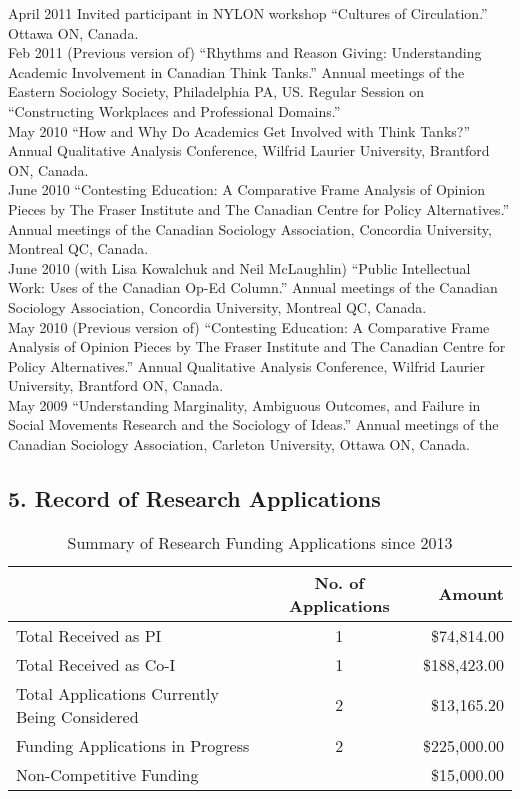 \documentclass[9pt,usenames,dvipsnames]{article}
\begin{document}
\ind April 2011 Invited participant in NYLON workshop ``Cultures of Circulation.'' Ottawa ON, Canada.\\

\ind Feb 2011 (Previous version of) ``Rhythms and Reason Giving: Understanding Academic Involvement in Canadian Think Tanks.'' Annual meetings of the Eastern Sociology Society, Philadelphia PA, US. Regular Session on ``Constructing Workplaces and Professional Domains.''\\

\ind May 2010 ``How and Why Do Academics Get Involved with Think Tanks?'' Annual Qualitative Analysis Conference, Wilfrid Laurier University, Brantford ON, Canada.\\

\ind June 2010 ``Contesting Education: A Comparative Frame Analysis of Opinion Pieces by The Fraser Institute and The Canadian Centre for Policy Alternatives.'' Annual meetings  of the Canadian Sociology Association, Concordia University, Montreal QC, Canada.\\

\ind June 2010 (with Lisa Kowalchuk and Neil McLaughlin) ``Public Intellectual Work: Uses of the Canadian Op-Ed Column.'' Annual meetings of the Canadian Sociology Association, Concordia University, Montreal QC, Canada.\\

\ind May 2010 (Previous version of) ``Contesting Education: A Comparative Frame Analysis of Opinion Pieces by The Fraser Institute and The Canadian Centre for Policy Alternatives.'' Annual Qualitative Analysis Conference, Wilfrid Laurier University, Brantford ON, Canada.\\

\ind May 2009 ``Understanding Marginality, Ambiguous Outcomes, and Failure in Social Movements Research and the Sociology of Ideas.'' Annual meetings of the Canadian Sociology Association, Carleton University, Ottawa ON, Canada.\\

\subsection*{5. Record of Research Applications}

\begin{table}[h!]
\caption{Summary of Research Funding Applications since 2013}\centering
\begin{tabular}{lcr} 
\hline                          
 & No. of Applications & Amount \\ 
\hline 
Total Received as PI & 1 & \$74,814.00\\
Total Received as Co-I & 1 & \$188,423.00\\
Total Applications Currently Being Considered & 2 & \$13,165.20\\
Funding Applications in Progress  & 2 & \$225,000.00 \\
Non-Competitive Funding &  & \$15,000.00 \\
\hline
\end{tabular}
\end{table}
\smallskip
\end{document}
